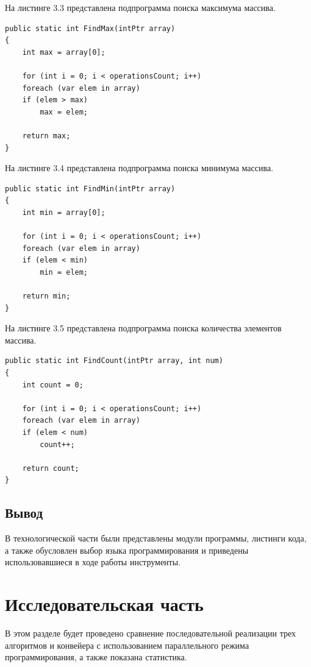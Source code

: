 \documentclass[12pt]{report}
\begin{document}
На листинге 3.3 представлена подпрограмма поиска максимума массива.

\begin{lstlisting}[label=some-code,caption=Подпрограмма поиска максимума массива]
public static int FindMax(intPtr array)
{
	int max = array[0];

	for (int i = 0; i < operationsCount; i++)
	foreach (var elem in array)
	if (elem > max)
		max = elem;

	return max;
}
\end{lstlisting}

На листинге 3.4 представлена подпрограмма поиска минимума массива.

\begin{lstlisting}[label=some-code,caption=Подпрограмма поиска минимума массива]
public static int FindMin(intPtr array)
{
	int min = array[0];

	for (int i = 0; i < operationsCount; i++)
	foreach (var elem in array)
	if (elem < min)
		min = elem;

	return min;
}
\end{lstlisting}

На листинге 3.5 представлена подпрограмма поиска количества элементов массива.

\begin{lstlisting}[label=some-code,caption= Подпрограмма поиска количества элементов массива]
public static int FindCount(intPtr array, int num)
{
	int count = 0;

	for (int i = 0; i < operationsCount; i++)
	foreach (var elem in array)
	if (elem < num)
		count++;

	return count;
} 
\end{lstlisting}


\section{Вывод}
В технологической части были представлены модули программы, листинги кода, а также обусловлен выбор языка программирования и приведены использовавшиеся в ходе работы инструменты.

\chapter{Исследовательская часть}

В этом разделе будет проведено сравнение последовательной реализации трех алгоритмов и конвейера с использованием параллельного режима программирования, а также показана статистика.
\end{document}
